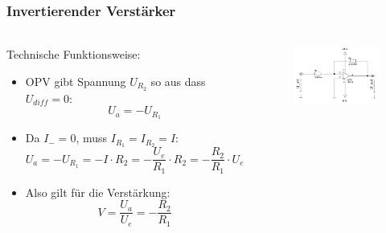 \begin{frame}
\frametitle{Invertierender Verstärker}
\framesubtitle{}
    \begin{columns}[c]
            \begin{block}{Technische Funktionsweise:}
                \begin{itemize}
                    \item OPV gibt Spannung $U_{R_2}$ so aus dass $U_{diff} =0$:
                        \begin{equation*}
                            U_a = -U_{R_1}
                        \end{equation*}
                    \item Da $I_- = 0$, muss $I_{R_1} = I_{R_2}=I$:
                        \begin{equation*}
                            U_a = -U_{R_1} = -I \cdot R_2 = - \frac{U_e}{R_1}
                            \cdot
                            R_2 = -\frac{R_2}{R_1} \cdot U_e
                        \end{equation*}
                    \item Also gilt für die Verstärkung:
                        \begin{equation*}
                            V = \frac{U_a}{U_e} = - \frac{R_2}{R_1}
                        \end{equation*}
                \end{itemize}
            \end{block}
            \begin{figure}[H]
            \begin{center}
                    \includegraphics[scale=0.1]{./img/schaltung/inv_verst_0.png}
            \end{center}
            \end{figure}
    \end{columns}
\end{frame}

